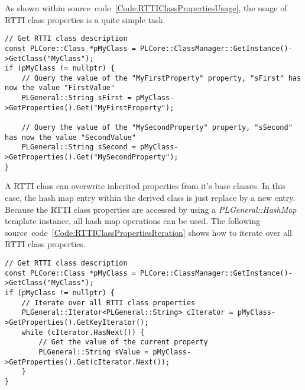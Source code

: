 As shown within source~code~\ref{Code:RTTIClassPropertiesUsage}, the usage of RTTI class properties is a quite simple task.
\begin{lstlisting}[float=htb,label=Code:RTTIClassPropertiesUsage,caption={Accessing RTTI class properties}]
// Get RTTI class description
const PLCore::Class *pMyClass = PLCore::ClassManager::GetInstance()->GetClass("MyClass");
if (pMyClass != nullptr) {
	// Query the value of the "MyFirstProperty" property, "sFirst" has now the value "FirstValue"
	PLGeneral::String sFirst = pMyClass->GetProperties().Get("MyFirstProperty");

	// Query the value of the "MySecondProperty" property, "sSecond" has now the value "SecondValue"
	PLGeneral::String sSecond = pMyClass->GetProperties().Get("MySecondProperty");
}
\end{lstlisting}
A RTTI class can overwrite inherited properties from it's base classes. In this case, the hash map entry within the derived class is just replace by a new entry. Because the RTTI class properties are accessed by using a \emph{PLGeneral::HashMap} template instance, all hash map operations can be used. The following source~code~\ref{Code:RTTIClassPropertiesIteration} shows how to iterate over all RTTI class properties.
\begin{lstlisting}[float=htb,label=Code:RTTIClassPropertiesIteration,caption={Iterating over all RTTI class properties}]
// Get RTTI class description
const PLCore::Class *pMyClass = PLCore::ClassManager::GetInstance()->GetClass("MyClass");
if (pMyClass != nullptr) {
	// Iterate over all RTTI class properties
	PLGeneral::Iterator<PLGeneral::String> cIterator = pMyClass->GetProperties().GetKeyIterator();
	while (cIterator.HasNext()) {
		// Get the value of the current property
		PLGeneral::String sValue = pMyClass->GetProperties().Get(cIterator.Next());
	}
}
\end{lstlisting}
